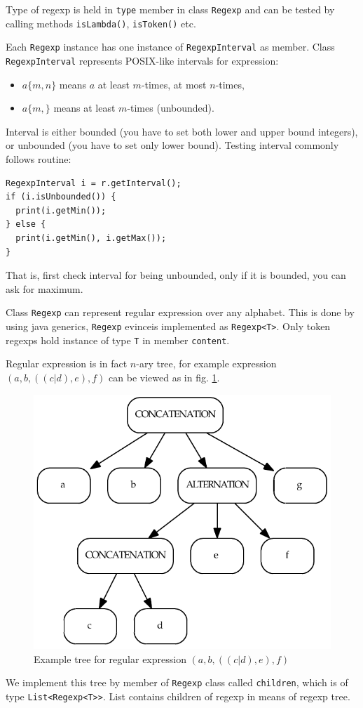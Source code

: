\documentclass[a4paper,10pt,oneside]{article}
\newcommand{\myscale}{0.74}
\newcommand{\code}[1]{\texttt{#1}}
\begin{document}
Type of regexp is held in \code{type} member in class \code{Regexp} and can be tested by calling methods \code{isLambda()}, \code{isToken()} etc.

Each \code{Regexp} instance has one instance of \code{RegexpInterval} as member.
Class \code{RegexpInterval} represents POSIX-like intervals for expression:
\begin{itemize}
	\item $a\{m,n\}$ means $a$ at least $m$-times, at most $n$-times,
	\item $a\{m,\}$ means at least $m$-times (unbounded).
\end{itemize}
Interval is either bounded (you have to set both lower and upper bound integers), or unbounded (you have to set only lower bound).
Testing interval commonly follows routine:
\begin{verbatim}
RegexpInterval i = r.getInterval();
if (i.isUnbounded()) {
  print(i.getMin());
} else {
  print(i.getMin(), i.getMax());
}
\end{verbatim}
That is, first check interval for being unbounded, only if it is bounded, you can ask for maximum.

Class \code{Regexp} can represent regular expression over any alphabet.
This is done by using java generics, \code{Regexp} evinceis implemented as \code{Regexp<T>}.
Only token regexps hold instance of type \code{T} in member \code{content}.

Regular expression is in fact $n$-ary tree, for example expression $(a, b, ((c | d), e), f)$ can be viewed as in fig. \ref{reg_tree}.
\begin{figure}
\caption{Example tree for regular expression $(a, b, ((c | d), e), f)$} \label{reg_tree}
\centering\includegraphics[scale=\myscale]{reg_tree}
\end{figure}
We implement this tree by member of \code{Regexp} class called \code{children}, which is of type \code{List<Regexp<T>{}>}.
List contains children of regexp in means of regexp tree.
\end{document}
